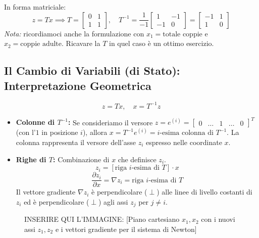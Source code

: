 \documentclass[11pt,a4paper]{article}
\begin{document}
In forma matriciale:
$$ z = Tx \implies T = \begin{bmatrix} 0 & 1 \\ 1 & 1 \end{bmatrix}, \quad T^{-1} = \frac{1}{-1} \begin{bmatrix} 1 & -1 \\ -1 & 0 \end{bmatrix} = \begin{bmatrix} -1 & 1 \\ 1 & 0 \end{bmatrix} $$
\textit{Nota:} ricordiamoci anche la formulazione con $x_1 = \text{totale coppie}$ e $x_2 = \text{coppie adulte}$. Ricavare la $T$ in quel caso è un ottimo esercizio.

\subsection{Il Cambio di Variabili (di Stato): Interpretazione Geometrica}
$$ z = Tx, \quad x = T^{-1}z $$

\begin{itemize}
    \item \textbf{Colonne di $T^{-1}$:}
    Se consideriamo il versore $z = e^{(i)} = \begin{bmatrix} 0 & \dots & 1 & \dots & 0 \end{bmatrix}^T$ (con l'$1$ in posizione $i$), allora $x = T^{-1}e^{(i)} = i\text{-esima colonna di } T^{-1}$.
    La colonna rappresenta il versore dell'asse $z_i$ espresso nelle coordinate $x$.

    \item \textbf{Righe di $T$:} Combinazione di $x$ che definisce $z_i$.
    $$ z_i = [\text{riga } i\text{-esima di } T] \cdot x $$
    $$ \frac{\partial z_i}{\partial x} = \nabla z_i = \text{riga } i\text{-esima di } T $$
    Il vettore gradiente $\nabla z_i$ è perpendicolare ($\perp$) alle linee di livello costanti di $z_i$ ed è perpendicolare ($\perp$) agli assi $z_j$ per $j \neq i$.
\end{itemize}

\begin{figure}[htbp]
    \centering
    \vspace{5cm} %
    \caption{INSERIRE QUI L'IMMAGINE: [Piano cartesiano $x_1, x_2$ con i nuovi assi $z_1, z_2$ e i vettori gradiente per il sistema di Newton]}
\end{figure}
\end{document}
